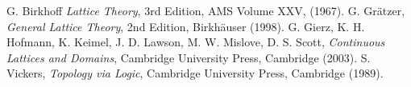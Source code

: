 \documentclass[12pt]{article}
\begin{document}
\begin{thebibliography}{8}
 G. Birkhoff {\em Lattice Theory}, 3rd Edition, AMS Volume XXV, (1967).
 G. Gr\"{a}tzer, {\em General Lattice Theory}, 2nd Edition, Birkh\"{a}user (1998).
 G. Gierz, K. H. Hofmann, K. Keimel, J. D. Lawson, M. W. Mislove, D. S. Scott, {\em Continuous Lattices and Domains}, Cambridge University Press, Cambridge (2003).
 S. Vickers, {\em Topology via Logic}, Cambridge University Press, Cambridge (1989).
\end{thebibliography}
\end{document}
